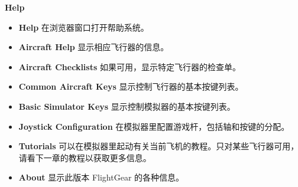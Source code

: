 \ifchinese
 \item \textbf{Help}
\begin{itemize}
 \item \textbf{Help} 在浏览器窗口打开帮助系统。
 \item \textbf{Aircraft Help} 显示相应飞行器的信息。
 \item \textbf{Aircraft Checklists} 如果可用，显示特定飞行器的检查单。
 \item \textbf{Common Aircraft Keys} 显示控制飞行器的基本按键列表。
 \item \textbf{Basic Simulator Keys} 显示控制模拟器的基本按键列表。
 \item \textbf{Joystick Configuration} 在模拟器里配置游戏杆，包括轴和按键的分配。
 \item \textbf{Tutorials} 可以在模拟器里起动有关当前飞机的教程。只对某些飞行器可用，请看下一章的教程以获取更多信息。
 \item \textbf{About} 显示此版本 FlightGear 的各种信息。
\end{itemize}
\fi


